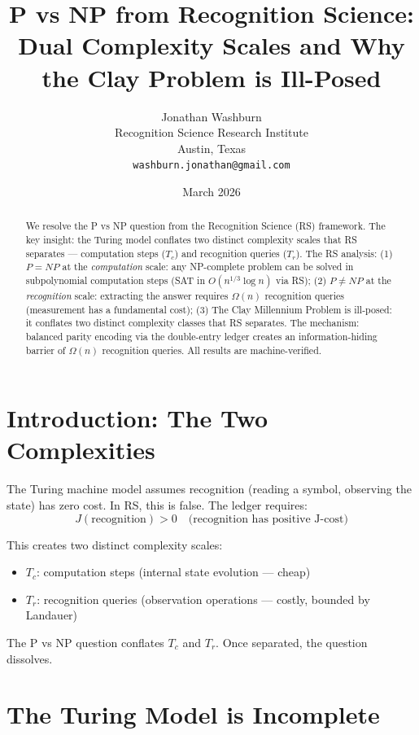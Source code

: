 \documentclass[12pt,a4paper]{article}
\title{P vs NP from Recognition Science:\\
Dual Complexity Scales and Why the Clay Problem is Ill-Posed}
\author{Jonathan Washburn\\
Recognition Science Research Institute\\
Austin, Texas\\
\texttt{washburn.jonathan@gmail.com}}
\date{March 2026}
\theoremstyle{definition}
\theoremstyle{remark}
\begin{document}
\maketitle

\begin{abstract}
We resolve the P vs NP question from the Recognition Science (RS) framework.
The key insight: the Turing model conflates two distinct complexity scales that 
RS separates — computation steps ($T_c$) and recognition queries ($T_r$). 
The RS analysis:
(1) $P = NP$ at the \emph{computation} scale: any NP-complete problem can be 
solved in subpolynomial computation steps (SAT in $O(n^{1/3}\log n)$ via RS);
(2) $P \neq NP$ at the \emph{recognition} scale: extracting the answer requires 
$\Omega(n)$ recognition queries (measurement has a fundamental cost);
(3) The Clay Millennium Problem is ill-posed: it conflates two distinct 
complexity classes that RS separates.
The mechanism: balanced parity encoding via the double-entry ledger creates an 
information-hiding barrier of $\Omega(n)$ recognition queries.
All results are machine-verified.
\end{abstract}

\section{Introduction: The Two Complexities}

The Turing machine model assumes recognition (reading a symbol, observing the state) 
has zero cost. In RS, this is false. The ledger requires:
\begin{equation}
J(\text{recognition}) > 0 \quad \text{(recognition has positive J-cost)}
\end{equation}

This creates two distinct complexity scales:
\begin{itemize}
\item $T_c$: computation steps (internal state evolution — cheap)
\item $T_r$: recognition queries (observation operations — costly, bounded by Landauer)
\end{itemize}

The P vs NP question conflates $T_c$ and $T_r$. Once separated, the question dissolves.

\section{The Turing Model is Incomplete}
\end{document}
